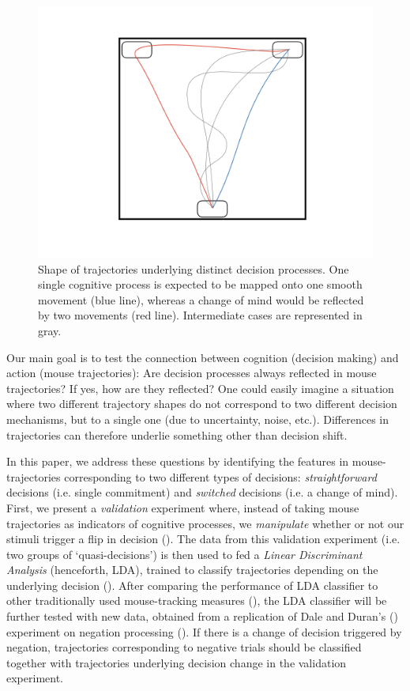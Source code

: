 \documentclass{article}
\begin{document}
\begin{figure}
\centering
\includegraphics[width=\textwidth]{trajectories.jpeg}
\caption{Shape of trajectories underlying distinct decision processes. One single cognitive process is expected to be mapped onto one smooth movement (blue line), whereas a change of mind would be reflected by two movements (red line). Intermediate cases are represented in gray.} \label{fig:scheme.traj}
\end{figure}

Our main goal is to test the connection between cognition (decision making) and action (mouse trajectories): Are decision processes always reflected in mouse trajectories? If yes, how are they reflected? 
One could easily imagine a situation where two different trajectory shapes do not correspond to two different decision mechanisms, but to a single one (due to uncertainty, noise, etc.). Differences in trajectories can therefore underlie something other than decision shift. 

In this paper, we address these questions by identifying the features in mouse-trajectories corresponding to two different types of decisions: \emph{straightforward} decisions (i.e. single commitment) and \emph{switched} decisions (i.e. a change of mind). 
First, we present a \emph{validation} experiment where, instead of taking mouse trajectories as indicators of cognitive processes, we \emph{manipulate} whether or not our stimuli trigger a flip in decision (). 
The data from this validation experiment (i.e. two groups of `quasi-decisions') is then used to fed a \emph{Linear Discriminant Analysis} (henceforth, LDA), trained to classify trajectories depending on the underlying decision (). 
After comparing the performance of LDA classifier to other traditionally used mouse-tracking measures (), 
the LDA classifier will be further tested with new data, obtained from a replication of Dale and Duran's (\citeyear{Dale2011}) experiment on negation processing (). If there is a change of decision triggered by negation, trajectories corresponding to negative trials should be classified together with trajectories underlying decision change in the validation experiment. 
\end{document}

